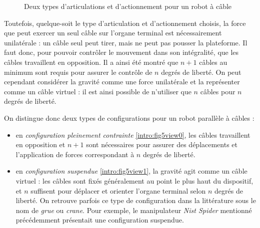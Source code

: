 \begin{figure}[!ht]
  \centering
       \hfill
    \caption{\footnotesize Deux types d'articulations et d'actionnement pour un robot à câble}
\label{intro:fig4}
\end{figure}

Toutefois, quelque-soit le type d'articulation et d'actionnement choisis, la force que peut exercer un seul câble sur l'organe terminal est nécessairement unilatérale : un câble seul peut tirer, mais ne peut pas pousser la plateforme. Il faut donc, pour pouvoir contrôler le mouvement dans son intégralité, que les câbles travaillent en opposition. Il a ainsi été montré que $n+1$ câbles au minimum sont requis pour assurer le contrôle de $n$ degrés de liberté. On peut cependant considérer la gravité comme une force unilatérale et la représenter comme un câble virtuel : il est ainsi possible de n'utiliser que $n$ câbles pour $n$ degrés de liberté.

On distingue donc deux types de configurations pour un robot parallèle à câbles :
\begin{itemize}
 \item en {\it configuration pleinement contrainte} \ref{intro:fig5view0}, les câbles travaillent en opposition et $n+1$ sont nécessaires pour assurer des déplacements et l'application de forces correspondant à $n$ degrés de liberté.
 \item en {\it configuration suspendue} \ref{intro:fig5view1}, la gravité agit comme un câble virtuel : les câbles sont fixés généralement au point le plus haut du dispositif, et $n$ suffisent pour déplacer et orienter l'organe terminal selon $n$ degrés de liberté. On retrouve parfois ce type de configuration dans la littérature sous le nom de {\it grue} ou {\it crane}. Pour exemple, le manipulateur {\it Nist Spider} \cite{1992:Albus.Bostelman.ea} mentionné précédemment présentait une configuration suspendue.
\end{itemize}

